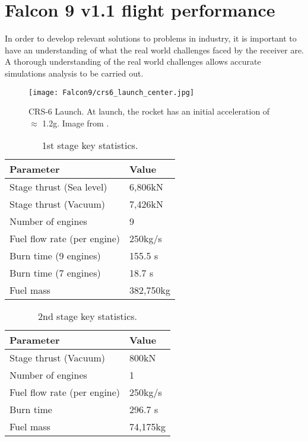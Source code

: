 \chapter{Falcon 9 v1.1 flight performance}
\label{ch:Falcon9}

In order to develop relevant solutions to  problems in industry, it is important to have an understanding of what the real world challenges faced by the receiver are. A thorough understanding of the real world challenges allows accurate simulations analysis to be carried out.

\begin{figure}[!htb] 
    \centering
    \texttt{[image: Falcon9/crs6\_launch\_center.jpg]} 
    \caption{CRS-6 Launch. At launch, the rocket has an initial acceleration of $\approx$ 1.2g. Image from \cite{SpaceXPhotos}.}
    \label{fig:Falcon9}
\end{figure}


\begin{table}[!htb]
\centering
\begin{tabular}{|l|l|}
\hline
\rowcolor[HTML]{C0C0C0} 
Parameter                   & Value     \\ \hline
Stage thrust (Sea level)    & 6,806kN   \\ \hline
\rowcolor[HTML]{EFEFEF} 
Stage thrust (Vacuum)       & 7,426kN   \\ \hline
Number of engines           & 9         \\ \hline
\rowcolor[HTML]{EFEFEF} 
Fuel flow rate (per engine) & 250kg/s   \\ \hline
Burn time (9 engines)       & 155.5 s   \\ \hline
\rowcolor[HTML]{EFEFEF} 
Burn time (7 engines)       & 18.7 s    \\ \hline
Fuel mass                   & 382,750kg \\ \hline
\end{tabular}
\caption{1st stage key statistics.}
\label{tab:1stStageStats}
\end{table}

\begin{table}[!htb]
\centering
\begin{tabular}{|l|l|}
\hline
\rowcolor[HTML]{C0C0C0} 
Parameter                   & Value    \\ \hline
\rowcolor[HTML]{EFEFEF} 
Stage thrust (Vacuum)       & 800kN    \\ \hline
Number of engines           & 1        \\ \hline
\rowcolor[HTML]{EFEFEF} 
Fuel flow rate (per engine) & 250kg/s  \\ \hline
Burn time                   & 296.7 s  \\ \hline
\rowcolor[HTML]{EFEFEF} 
Fuel mass                   & 74,175kg \\ \hline
\end{tabular}
\caption{2nd stage key statistics.}
\label{tab:2ndStageStats}
\end{table}


